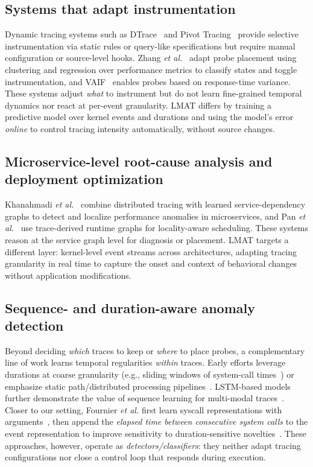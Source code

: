 \documentclass[preprint,12pt]{elsarticle}
\begin{document}
\subsection{Systems that adapt instrumentation}
Dynamic tracing systems such as DTrace~\cite{cantrill2004dynamic} and Pivot Tracing~\cite{mace2015pivot} provide selective instrumentation via static rules or query-like specifications but require manual configuration or source-level hooks. Zhang \textit{et al.}~\cite{zhang2020diagnostic} adapt probe placement using clustering and regression over performance metrics to classify states and toggle instrumentation, and VAIF~\cite{toslali2021automating,toslali2022vaif} enables probes based on response-time variance. These systems adjust \emph{what} to instrument but do not learn fine-grained temporal dynamics nor react at per-event granularity. LMAT differs by training a predictive model over kernel events and durations and using the model’s error \emph{online} to control tracing intensity automatically, without source changes.


\subsection{Microservice-level root-cause analysis and deployment optimization}
Khanahmadi \textit{et al.}~\cite{khanahmadi2023detection} combine distributed tracing with learned service-dependency graphs to detect and localize performance anomalies in microservices, and Pan \textit{et al.}~\cite{pan2023tracing} use trace-derived runtime graphs for locality-aware scheduling. These systems reason at the service graph level for diagnosis or placement. LMAT targets a different layer: kernel-level event streams across architectures, adapting tracing granularity in real time to capture the onset and context of behavioral changes without application modifications.


\subsection{Sequence- and duration-aware anomaly detection}
Beyond deciding \emph{which} traces to keep or \emph{where} to place probes, a complementary line of work learns temporal regularities \emph{within} traces. Early efforts leverage durations at coarse granularity (e.g., sliding windows of system-call times~\cite{kohyarnejadfard2019system}) or emphasize static path/distributed processing pipelines~\cite{janecek2022performance,denys2023distributed}. LSTM-based models further demonstrate the value of sequence learning for multi-modal traces~\cite{nedelkoski2019anomaly}. Closer to our setting, Fournier \textit{et al.} first learn syscall representations with arguments~\cite{fournier2021improving}, then append the \emph{elapsed time between consecutive system calls} to the event representation to improve sensitivity to duration-sensitive novelties~\cite{fournier2023language}. These approaches, however, operate as \emph{detectors/classifiers}: they neither adapt tracing configurations nor close a control loop that responds during execution.
\end{document}
